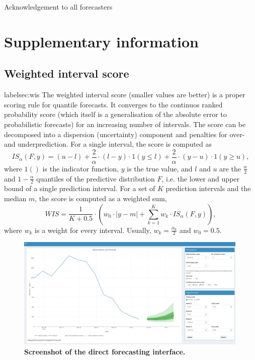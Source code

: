 \documentclass[10pt,a4paper,twocolumn]{article}
\begin{document}
Acknowledgement to all forecasters










\appendix
\section*{Supplementary information}


\subsection*{Weighted interval score}
label{sec:wis}
The weighted interval score (smaller values are better) is a proper scoring rule for quantile forecasts. It converges to the continuos ranked probability score (which itself is a generalisation of the absolute error to probabilistic forecasts) for an increasing number of intervals. The score can be decomposed into a dispersion (uncertainty) component and penalties for over- and underprediction. For a single interval, the score is computed as 
  $$IS_\alpha(F,y) = (u-l) + \frac{2}{\alpha} \cdot (l-y) \cdot 1(y \leq l) + \frac{2}{\alpha} \cdot (y-u) \cdot 1(y \geq u), $$ 
  where $1()$ is the indicator function, $y$ is the true value, and $l$ and $u$ are the $\frac{\alpha}{2}$ and $1 - \frac{\alpha}{2}$ quantiles of the predictive distribution $F$, i.e. the lower and upper bound of a single prediction interval. For a set of $K$ prediction intervals and the median $m$, the score is computed as a weighted sum, 
  $$WIS = \frac{1}{K + 0.5} \cdot \left( w_0 \cdot |y - m| + \sum_{k = 1}^{K} w_k \cdot IS_{\alpha}(F, y) \right), $$
  where $w_k$ is a weight for every interval. Usually, $w_k = \frac{\alpha_k}{2}$ and $w_0 = 0.5$. 
  
  
\begin{figure}[H]
\centering
\includegraphics[width=0.99\textwidth]{../output/figures/screenshot-crowd-classical.png}
\caption{\bf{Screenshot of the direct forecasting interface.}}
\label{fig:screenshot-classical}
\end{figure}
\end{document}
